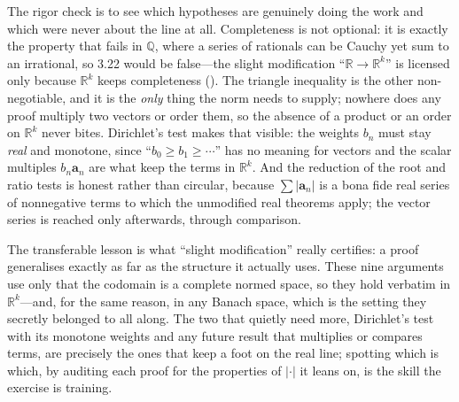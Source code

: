 \documentclass[main.tex]{subfiles}
\begin{document}
\begin{Reflection}
The rigor check is to see which hypotheses are genuinely doing the work and which were never about the
line at all. Completeness is not optional: it is exactly the property that fails in $\mathbb Q$, where a
series of rationals can be Cauchy yet sum to an irrational, so 3.22 would be false---the slight
modification ``$\mathbb R\to\mathbb R^k$'' is licensed only because $\mathbb R^k$ keeps completeness
(). The triangle inequality is the other non-negotiable, and it is the
\emph{only} thing the norm needs to supply; nowhere does any proof multiply two vectors or order them, so
the absence of a product or an order on $\mathbb R^k$ never bites. Dirichlet's test makes that visible:
the weights $b_n$ must stay \emph{real} and monotone, since ``$b_0\ge b_1\ge\cdots$'' has no meaning for
vectors and the scalar multiples $b_n\mathbf a_n$ are what keep the terms in $\mathbb R^k$. And the
reduction of the root and ratio tests is honest rather than circular, because $\sum|\mathbf a_n|$ is a
bona fide real series of nonnegative terms to which the unmodified real theorems apply; the vector series
is reached only afterwards, through comparison.

The transferable lesson is what ``slight modification'' really certifies: a proof generalises exactly as
far as the structure it actually uses. These nine arguments use only that the codomain is a complete
normed space, so they hold verbatim in $\mathbb R^k$---and, for the same reason, in any Banach space,
which is the setting they secretly belonged to all along. The two that quietly need more, Dirichlet's
test with its monotone weights and any future result that multiplies or compares terms, are precisely the
ones that keep a foot on the real line; spotting which is which, by auditing each proof for the
properties of $|\cdot|$ it leans on, is the skill the exercise is training.
\end{Reflection}
\end{document}
